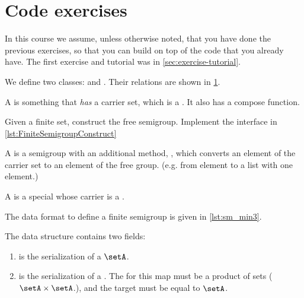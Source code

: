 \section{Code exercises}

\begin{remark}
    In this course we assume, unless otherwise noted, that you have done the previous exercises, so that you can build on top of the code that you already have.
The first exercise and tutorial was in \cref{sec:exercise-tutorial}.
\end{remark}

\begin{figure*}[b]
    \label{fig:uml_semigroup}
\end{figure*}

We define two classes: \Semigroup and \FiniteSemigroup.
Their relations are shown in \cref{fig:uml_semigroup}.

A \Semigroup is something that \emph{has} a carrier set, which is a \Setoid.
It also has a compose function.



\begin{codeexercise}
    \label{ex:TestFiniteSemigroupConstruct}
    Given a finite set, construct the free semigroup.
    Implement the interface in \cref{lst:FiniteSemigroupConstruct}
\end{codeexercise}


A \FreeSemigroup is a semigroup with an additional method, , which converts an element of the carrier set to an element of the free group. (e.g. from element to a list with one element.)




A \FiniteSemigroup is a special \Semigroup whose carrier is a \FiniteSet.




The data format to define a finite semigroup is given in \cref{lst:sm_min3}.

The data structure contains two fields:
\begin{enumerate}
    \item {} is the serialization of a \FiniteSet $\setA$.
    \item {} is the serialization of a \FiniteMap.
The 
    for this map must be a product of sets ($\setA \times \setA$.), and the target must be equal to $\setA$.
\end{enumerate}

